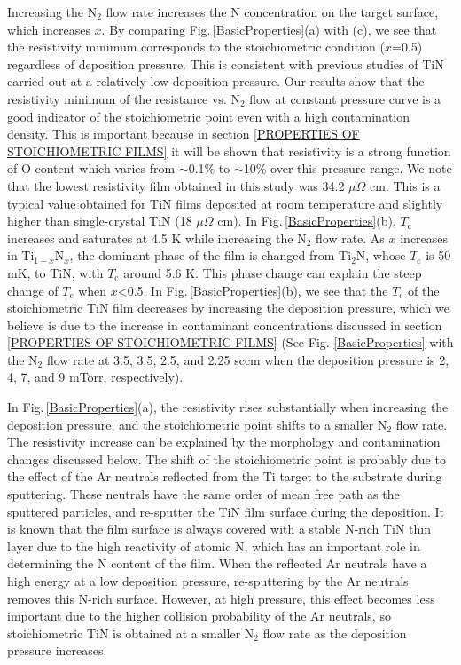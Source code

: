 \documentclass{report}
\begin{document}
Increasing the N$_{2}$ flow rate increases the N concentration on the target surface, which increases $x$. By comparing Fig.\,\ref{BasicProperties}(a) with (c), we see that the resistivity minimum corresponds to the stoichiometric condition ($x$=0.5) regardless of deposition pressure. This is consistent with previous studies of TiN carried out at a relatively low deposition pressure.\cite{Ahn1983,Schiller1984}   Our results show that the resistivity minimum of the resistance vs. N$_{2}$ flow at constant pressure curve is a good indicator of the stoichiometric point even with a high contamination density.  This is important because in section \ref{PROPERTIES OF STOICHIOMETRIC FILMS} it will be shown that resistivity is a strong function of O content which varies from $\sim$0.1\% to $\sim$10\% over this pressure range. We note that the lowest resistivity film obtained in this study was 34.2 $\mu$$\Omega$ cm. This is a typical value obtained for TiN films deposited at room temperature and slightly higher than single-crystal TiN (18 $\mu$$\Omega$ cm).\cite{Johansson1985} In Fig.\,\ref{BasicProperties}(b), $T_{\text{c}}$ increases and saturates at 4.5 K while increasing the N$_{2}$ flow rate. As $x$ increases in Ti$_{1-x}$N$_{x}$, the dominant phase of the film is changed from Ti$_{2}$N, whose $T_{\text{c}}$ is 50 mK, to TiN, with $T_{\text{c}}$ around 5.6 K.\cite{Wriedt1987, Vissers2013, Penilla2008} This phase change can explain the steep change of $T_{\text{c}}$ when $x$<0.5. In Fig.\,\ref{BasicProperties}(b), we see that the $T_{\text{c}}$ of the stoichiometric TiN film decreases by increasing the deposition pressure, which we believe is due to the increase in contaminant concentrations discussed in section \ref{PROPERTIES OF STOICHIOMETRIC FILMS} (See Fig. \ref{BasicProperties} with the N$_{2}$ flow rate at 3.5, 3.5, 2.5, and 2.25 sccm when the deposition pressure is 2, 4, 7, and 9 mTorr, respectively).

In Fig.\,\ref{BasicProperties}(a), the resistivity rises substantially when increasing the deposition pressure, and the stoichiometric point shifts to a smaller N$_{2}$ flow rate. The resistivity increase can be explained by the morphology and contamination changes discussed below. The shift of the stoichiometric point is probably due to the effect of the Ar neutrals reflected from the Ti target to the substrate during sputtering. These neutrals have the same order of mean free path as the sputtered particles,\cite{Lu2012} and re-sputter the TiN film surface during the deposition. It is known that the film surface is always covered with a stable N-rich TiN thin layer due to the high reactivity of atomic N, which has an important role in determining the N content of the film. When the reflected Ar neutrals have a high energy at a low deposition pressure, re-sputtering by the Ar neutrals removes this N-rich surface. However, at high pressure, this effect becomes less important due to the higher collision probability of the Ar neutrals, so stoichiometric TiN is obtained at a smaller N$_{2}$ flow rate as the deposition pressure increases.\cite{Adjaottor1995}
\end{document}
